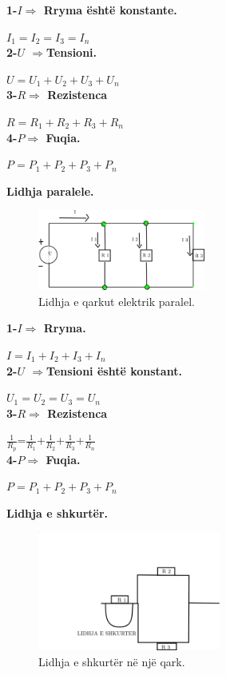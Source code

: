 \documentclass[twocolumn]{article}
\begin{document}
	\textbf{1-$I \Rightarrow $ Rryma është konstante.}
	
	$I_1=I_2=I_3=I_n$\\
	
	\textbf{2-$U$ $\Rightarrow$Tensioni.}
	
	$U=U_1+U_2+U_3+U_n$\\
	
	\textbf{3-$R \Rightarrow $ Rezistenca}
	
	$R=R_1+R_2+R_3+R_n$\\
	
	\textbf{4-$P \Rightarrow$ Fuqia.}
	
	$P=P_1+P_2+P_3+P_n$\\
	
	\begin{center}
		\textbf{Lidhja paralele.}
		
	\end{center}
	\begin{figure}[h]
		\includegraphics[width=55mm]{Imazhet/qarku paralel.png}
		\caption{Lidhja e qarkut elektrik paralel.}
		\label{fig:boat1}
	\end{figure}
	
	\textbf{1-$I \Rightarrow $ Rryma.}
	
	$I=I_1+I_2+I_3+I_n$\\
	
	\textbf{2-$U$ $\Rightarrow$Tensioni është konstant.}
	
	$U_1=U_2=U_3=U_n$\\
	
	\textbf{3-$R \Rightarrow $ Rezistenca}
	
	$\frac{1}{R_p}$=$\frac{1}{R_1}$+$\frac{1}{R_2}$+$\frac{1}{R_3}$+$\frac{1}{R_n}$\\
	
	\textbf{4-$P \Rightarrow$ Fuqia.}
	
	$P=P_1+P_2+P_3+P_n$\\
	
	\begin{center}
		\textbf{Lidhja e shkurtër.}
	\end{center}
	\begin{figure}[h]
		\includegraphics[width=60mm]{Imazhet/Lidhja e shkurter.png}
		\caption{Lidhja e shkurtër në një qark.}
		\label{fig:boat1}
	\end{figure}
	
\end{document}
